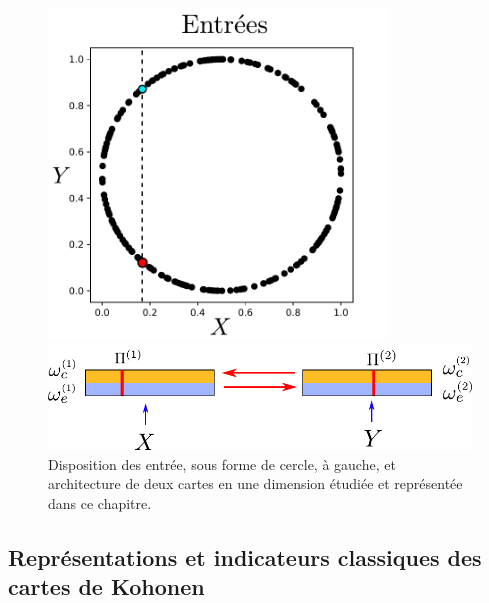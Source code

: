 \begin{figure}
\begin{minipage}{0.4\textwidth}
\centering
\includegraphics[width=0.8\textwidth]{2som_inp_noinformation}
\end{minipage}
\begin{minipage}{0.6\textwidth}
\includegraphics[width=\textwidth]{2som_archi}
\end{minipage}
\caption{Disposition des entrée, sous forme de cercle, à gauche, et architecture de deux cartes en une dimension étudiée et représentée dans ce chapitre.\label{fig:exp}}
\end{figure}

\subsection{Représentations et indicateurs classiques des cartes de Kohonen}

